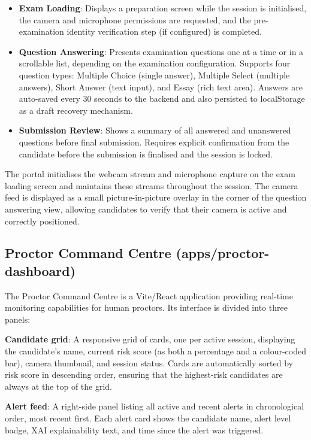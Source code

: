 \begin{itemize}
    \item \textbf{Exam Loading}: Displays a preparation screen while the session is initialised, the camera and microphone permissions are requested, and the pre-examination identity verification step (if configured) is completed.
    \item \textbf{Question Answering}: Presents examination questions one at a time or in a scrollable list, depending on the examination configuration. Supports four question types: Multiple Choice (single answer), Multiple Select (multiple answers), Short Answer (text input), and Essay (rich text area). Answers are auto-saved every 30 seconds to the backend and also persisted to localStorage as a draft recovery mechanism.
    \item \textbf{Submission Review}: Shows a summary of all answered and unanswered questions before final submission. Requires explicit confirmation from the candidate before the submission is finalised and the session is locked.
\end{itemize}

The portal initialises the webcam stream and microphone capture on the exam loading screen and maintains these streams throughout the session. The camera feed is displayed as a small picture-in-picture overlay in the corner of the question answering view, allowing candidates to verify that their camera is active and correctly positioned.

\subsection{Proctor Command Centre (apps/proctor-dashboard)}

The Proctor Command Centre is a Vite/React application providing real-time monitoring capabilities for human proctors. Its interface is divided into three panels:

\textbf{Candidate grid}: A responsive grid of cards, one per active session, displaying the candidate's name, current risk score (as both a percentage and a colour-coded bar), camera thumbnail, and session status. Cards are automatically sorted by risk score in descending order, ensuring that the highest-risk candidates are always at the top of the grid.

\textbf{Alert feed}: A right-side panel listing all active and recent alerts in chronological order, most recent first. Each alert card shows the candidate name, alert level badge, XAI explainability text, and time since the alert was triggered.

